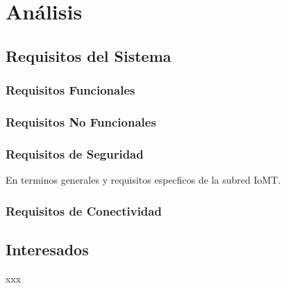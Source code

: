 
\chapter{Análisis }\label{análisis}

\section{Requisitos del Sistema}

\subsection{Requisitos Funcionales}

\subsection{Requisitos No Funcionales}

\subsection{Requisitos de Seguridad}

En terminos generales y requisitos especficos de la subred IoMT.

\subsection{Requisitos de Conectividad}

\section{Interesados}
xxx

